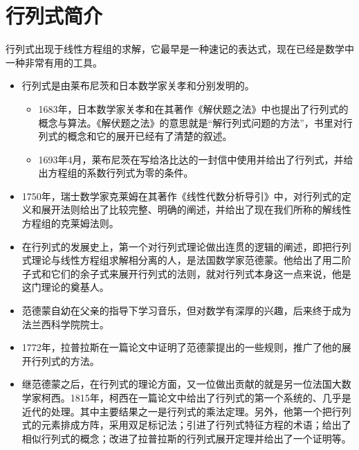 \section{行列式简介}


\begin{frame}
行列式出现于线性方程组的求解，它最早是一种速记的表达式，现在已经是数学中一种非常有用的工具。
\end{frame}

\begin{frame}
\begin{itemize}
\item 行列式是由莱布尼茨和日本数学家关孝和分别发明的。 \\[0.1in]
  \begin{itemize}
  \item 1683年，日本数学家关孝和在其著作《解伏题之法》中也提出了行列式的概念与算法。《解伏题之法》的意思就是“解行列式问题的方法”，书里对行列式的概念和它的展开已经有了清楚的叙述。 \\[0.1in]
  
  \item 1693年4月，莱布尼茨在写给洛比达的一封信中使用并给出了行列式，并给出方程组的系数行列式为零的条件。\\[0.1in]

  \end{itemize}
  
\item
  1750年，瑞士数学家克莱姆在其著作《线性代数分析导引》中，对行列式的定义和展开法则给出了比较完整、明确的阐述，并给出了现在我们所称的解线性方程组的克莱姆法则。
\end{itemize}



\end{frame}

\begin{frame}
\begin{itemize}

\item
  在行列式的发展史上，第一个对行列式理论做出连贯的逻辑的阐述，即把行列式理论与线性方程组求解相分离的人，是法国数学家范德蒙。他给出了用二阶子式和它们的余子式来展开行列式的法则，就对行列式本身这一点来说，他是这门理论的奠基人。
  \\[0.1in] 
\item[] 范德蒙自幼在父亲的指导下学习音乐，但对数学有深厚的兴趣，后来终于成为法兰西科学院院士。\\[0.2in] 
\item
  1772年，拉普拉斯在一篇论文中证明了范德蒙提出的一些规则，推广了他的展开行列式的方法。 \\[0.1in] 
  
\item
  继范德蒙之后，在行列式的理论方面，又一位做出贡献的就是另一位法国大数学家柯西。1815年，柯西在一篇论文中给出了行列式的第一个系统的、几乎是近代的处理。其中主要结果之一是行列式的乘法定理。另外，他第一个把行列式的元素排成方阵，采用双足标记法；引进了行列式特征方程的术语；给出了相似行列式的概念；改进了拉普拉斯的行列式展开定理并给出了一个证明等。
\end{itemize}
\end{frame}



